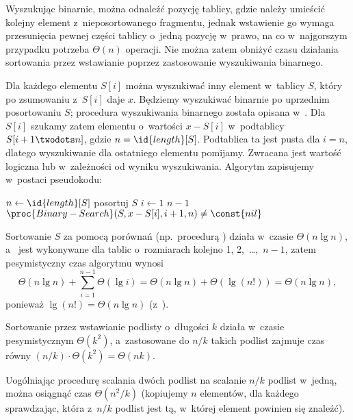 \exercise %
Wyszukując binarnie, można odnaleźć pozycję tablicy, gdzie należy umieścić kolejny element z~nieposortowanego fragmentu, jednak wstawienie go wymaga przesunięcia pewnej części tablicy o~jedną pozycję w~prawo, na co w~najgorszym przypadku potrzeba $\Theta(n)$ operacji. Nie można zatem obniżyć czasu działania sortowania przez wstawianie poprzez zastosowanie wyszukiwania binarnego.

\exercise %
Dla każdego elementu $S[i]$ można wyszukiwać inny element w~tablicy $S$, który po zsumowaniu z~$S[i]$ daje $x$. Będziemy wyszukiwać binarnie po uprzednim posortowaniu $S$; procedura wyszukiwania binarnego została opisana w~. Dla $S[i]$ szukamy zatem elementu o~wartości $x-S[i]$ w~podtablicy $S[i+1\twodots n]$, gdzie $n=\id{length}[S]$. Podtablica ta jest pusta dla $i=n$, dlatego wyszukiwanie dla ostatniego elementu pomijamy. Zwracana jest wartość logiczna  lub  w~zależności od wyniku wyszukiwania. Algorytm zapisujemy w~postaci pseudokodu:
\begin{codebox}
\li	$n\gets\id{length}[S]$
\li	posortuj $S$
\li	\For $i\gets1$ \To $n-1$
\li		\Do
			\If $\proc{Binary-Search}(S,x-S[i],i+1,n)\ne\const{nil}$
\li				\Then \Return {}
				\End
		\End
\li	\Return {}
\end{codebox}

Sortowanie $S$ za pomocą porównań (np.\ procedurą ) działa w~czasie $\Theta(n\lg n)$, a~ jest wykonywane dla tablic o~rozmiarach kolejno 1, 2,~\dots,~$n-1$, zatem pesymistyczny czas algorytmu  wynosi
\[
	\Theta(n\lg n)+\sum_{i=1}^{n-1}\Theta(\lg i) = \Theta(n\lg n)+\Theta(\lg(n!)) = \Theta(n\lg n),
\]
ponieważ $\lg(n!)=\Theta(n\lg n)$ (z~).

\problems


\subproblem %
Sortowanie przez wstawianie podlisty o~długości $k$ działa w~czasie pesymistycznym $\Theta(k^2)$, a~zastosowane do $n/k$ takich podlist zajmuje czas równy $(n/k)\cdot\Theta(k^2)=\Theta(nk)$.

\subproblem %
Uogólniając procedurę scalania dwóch podlist na scalanie $n/k$ podlist w~jedną, można osiągnąć czas $\Theta(n^2\!/k)$ (kopiujemy $n$ elementów, dla każdego sprawdzając, która z~$n/k$ podlist jest tą, w~której element powinien się znaleźć).

